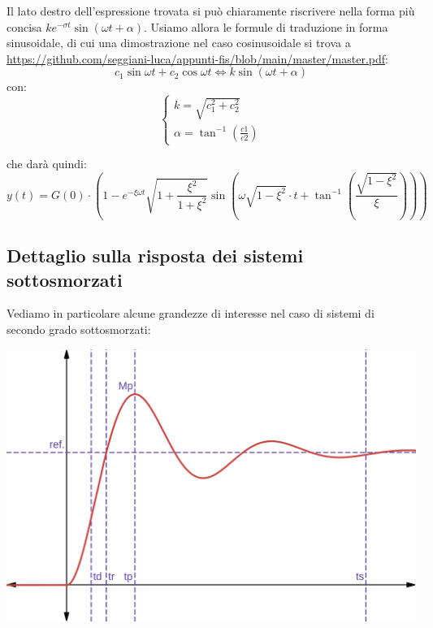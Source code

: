 \documentclass[a4paper,11pt]{article}
\begin{document}
Il lato destro dell'espressione trovata si può chiaramente riscrivere nella forma più concisa $ke^{-\sigma t} \sin(\omega t + \alpha)$. 
Usiamo allora le formule di traduzione in forma sinusoidale, di cui una dimostrazione nel caso cosinusoidale si trova a \url{https://github.com/seggiani-luca/appunti-fis/blob/main/master/master.pdf}:
\[
	c_1 \sin{\omega t} + c_2 \cos{\omega t}
	\Leftrightarrow
	k \sin(\omega t + \alpha)
\]
con:
\[
	\begin{cases}
		k 	= \sqrt{c_1^2 + c_2^2} \\ 
		\alpha = \tan^{-1}(\frac{c1}{c2})
	\end{cases}
\]

che darà quindi:
$$
y(t) = G(0) \cdot \left( 1 - e^{-\xi \omega t} \sqrt{1 + \frac{\xi^2}{1 + \xi^2}} \sin\left( \omega \sqrt{1 - \xi^2} \cdot t + \tan^{-1} \left( \frac{\sqrt{1 - \xi^2}}{\xi} \right) \right) \right) 
$$

\noindent
\begin{minipage}{\textwidth}
\subsection{Dettaglio sulla risposta dei sistemi sottosmorzati}
Vediamo in particolare alcune grandezze di interesse nel caso di sistemi di secondo grado sottosmorzati:

\par\bigskip

\begin{center}
\includegraphics[scale=0.29]{../figures/damped_oscillator.png}
\end{center}
\end{minipage}
\end{document}
